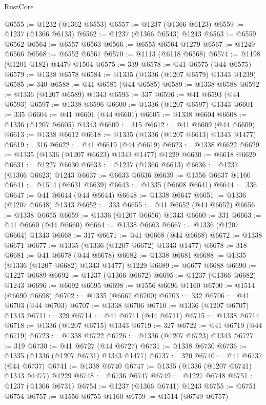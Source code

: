 \begin{lexlean}{RustCore}
\begin{coremodule}
@6555 := @1232 (@1362 @6553)
@6557 := @1237 (@1366 @6123)
@6559 := @1237 (@1366 @6133)
@6562 := @1237 (@1366 @6543) @1243
@6563 := @6559 @6562
@6564 := @6557 @6563
@6566 := @6555 @6564 @1279
@6567 := @1249 @6566
@6568 := @6552 @6567
@6570 := @1113 (@6118 @6568)
@6574 := @1198 (@1201 @182) @4479 @1504
@6575 := 339
@6578 := @41 @6575 (@44 @6575)
@6579 := @1338 @6578
@6584 := @1335 (@1336 (@1207 @6579) @1343 @1239)
@6585 := 340
@6588 := @41 @6585 (@44 @6585)
@6589 := @1338 @6588
@6592 := @1336 (@1207 @6589) @1343
@6593 := 337
@6596 := @41 @6593 (@44 @6593)
@6597 := @1338 @6596
@6600 := @1336 (@1207 @6597) @1343
@6601 := 335
@6604 := @41 @6601 (@44 @6601)
@6605 := @1338 @6604
@6608 := @1336 (@1207 @6605) @1343
@6609 := 315
@6612 := @41 @6609 (@44 @6609)
@6613 := @1338 @6612
@6618 := @1335 (@1336 (@1207 @6613) @1343 @1477)
@6619 := 316
@6622 := @41 @6619 (@44 @6619)
@6623 := @1338 @6622
@6629 := @1335 (@1336 (@1207 @6623) @1343 @1477) @1229
@6630 := @6618 @6629
@6631 := @1227 @6630
@6633 := @1237 (@1366 @6613)
@6636 := @1237 (@1366 @6623) @1243
@6637 := @6633 @6636
@6639 := @1556 @6637 @1160
@6641 := @1514 (@6631 @6639)
@6643 := @1335 (@6608 @6641)
@6644 := 336
@6647 := @41 @6644 (@44 @6644)
@6648 := @1338 @6647
@6651 := @1336 (@1207 @6648) @1343
@6652 := 333
@6655 := @41 @6652 (@44 @6652)
@6656 := @1338 @6655
@6659 := @1336 (@1207 @6656) @1343
@6660 := 331
@6663 := @41 @6660 (@44 @6660)
@6664 := @1338 @6663
@6667 := @1336 (@1207 @6664) @1343
@6668 := 317
@6671 := @41 @6668 (@44 @6668)
@6672 := @1338 @6671
@6677 := @1335 (@1336 (@1207 @6672) @1343 @1477)
@6678 := 318
@6681 := @41 @6678 (@44 @6678)
@6682 := @1338 @6681
@6688 := @1335 (@1336 (@1207 @6682) @1343 @1477) @1229
@6689 := @6677 @6688
@6690 := @1227 @6689
@6692 := @1237 (@1366 @6672)
@6695 := @1237 (@1366 @6682) @1243
@6696 := @6692 @6695
@6698 := @1556 @6696 @1160
@6700 := @1514 (@6690 @6698)
@6702 := @1335 (@6667 @6700)
@6703 := 332
@6706 := @41 @6703 (@44 @6703)
@6707 := @1338 @6706
@6710 := @1336 (@1207 @6707) @1343
@6711 := 329
@6714 := @41 @6711 (@44 @6711)
@6715 := @1338 @6714
@6718 := @1336 (@1207 @6715) @1343
@6719 := 327
@6722 := @41 @6719 (@44 @6719)
@6723 := @1338 @6722
@6726 := @1336 (@1207 @6723) @1343
@6727 := 319
@6730 := @41 @6727 (@44 @6727)
@6731 := @1338 @6730
@6736 := @1335 (@1336 (@1207 @6731) @1343 @1477)
@6737 := 320
@6740 := @41 @6737 (@44 @6737)
@6741 := @1338 @6740
@6747 := @1335 (@1336 (@1207 @6741) @1343 @1477) @1229
@6748 := @6736 @6747
@6749 := @1227 @6748
@6751 := @1237 (@1366 @6731)
@6754 := @1237 (@1366 @6741) @1243
@6755 := @6751 @6754
@6757 := @1556 @6755 @1160
@6759 := @1514 (@6749 @6757)

\end{coremodule}
\end{lexlean}
